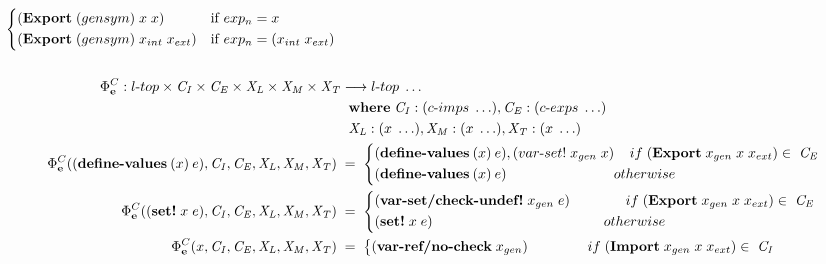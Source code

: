 \documentclass[sigplan,screen,anonymous]{acmart}
\def\dash {\text{-}}
\begin{document}
\begin{figure}[tbp]
\begin{align*}
\begin{cases*}
      (\textbf{Export}\;(gensym)\;x\;x) & if $exp_n = x$ \\
      (\textbf{Export}\;(gensym)\;x_{int}\;x_{ext}) & if $exp_n = (x_{int}\;x_{ext})$ \\
    \end{cases*} \\ \\
    \Phi^C_{\textbf{e}} : l\dash top \times \mathit{C_I} \times \mathit{C_E} \times \mathit{X_L} \times\mathit{X_M} \times\mathit{X_T} &\longrightarrow l\dash top\; \ldots \\
    \;          &\;\; \where \mathit{C_I} : (c\dash imps\;\ldots), \mathit{C_E} : (c\dash exps\;\ldots) \\
    \;          &\;\; \mathit{X_L} : (x\;\ldots), \mathit{X_M} : (x\;\ldots), \mathit{X_T} : (x\;\ldots) \\
    \Phi^C_{\textbf{e}}((\textbf{define\dash values}\:(x)\:e),\mathit{C_I}, \mathit{C_E}, \mathit{X_L},\mathit{X_M},\mathit{X_T})\; &=\; \begin{cases*}
      (\textbf{define\dash values}\:(x)\:e), (var\dash set!\; x_{gen}\; x)\;\; \;\; if\; (\textbf{Export}\; x_{gen}\; x\; x_{ext}) \in\;\mathit{C_E} \\
      (\textbf{define\dash values}\:(x)\:e) \hspace{2.5cm} \;\; otherwise
    \end{cases*} \\
    \Phi^C_{\textbf{e}}((\textbf{set!}\; x\; e),\mathit{C_I}, \mathit{C_E}, \mathit{X_L},\mathit{X_M},\mathit{X_T})\; &=\; \begin{cases*}
      (\textbf{var\dash set/check\dash undef!}\; x_{gen}\; e) \hspace{1.4cm} if\; (\textbf{Export}\; x_{gen}\; x\; x_{ext}) \in\;\mathit{C_E}\\
      (\textbf{set!}\; x\; e) \hspace{4.3cm} otherwise
    \end{cases*} \\
    \Phi^C_{\textbf{e}}(x,\mathit{C_I}, \mathit{C_E}, \mathit{X_L},\mathit{X_M},\mathit{X_T})\; &=\; \begin{cases*}
      (\textbf{var\dash ref/no\dash check}\; x_{gen}) \hspace{1.5cm} if\; (\textbf{Import}\; x_{gen}\; x\; x_{ext}) \in\;\mathit{C_I} \\

\end{cases*}
\end{align*}
\end{figure}
\end{document}
